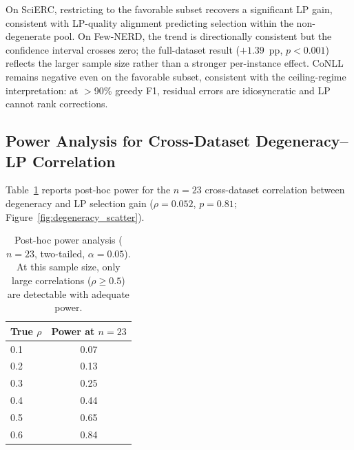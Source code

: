 \begin{table}[h]
\centering
\small
\caption{LP selection on the favorable subset (non-degenerate instances with LP range above the dataset-specific median) per dataset (Qwen3-8B, $N{=}8$, $T{=}1.0$). CI: bootstrap 95\% confidence interval.}
\label{tab:conditional_decomp}
\end{table}

On SciERC, restricting to the favorable subset recovers a significant LP gain, consistent with LP-quality alignment predicting selection within the non-degenerate pool.
On Few-NERD, the trend is directionally consistent but the confidence interval crosses zero; the full-dataset result ($+1.39$~pp, $p{<}0.001$) reflects the larger sample size rather than a stronger per-instance effect.
CoNLL remains negative even on the favorable subset, consistent with the ceiling-regime interpretation: at $>$90\% greedy F1, residual errors are idiosyncratic and LP cannot rank corrections.

\subsection{Power Analysis for Cross-Dataset Degeneracy--LP Correlation}\label{app:power_analysis}

Table~\ref{tab:power_analysis} reports post-hoc power for the $n{=}23$ cross-dataset correlation between degeneracy and LP selection gain ($\rho{=}0.052$, $p{=}0.81$; Figure~\ref{fig:degeneracy_scatter}).

\begin{table}[h]
\centering
\small
\caption{Post-hoc power analysis ($n{=}23$, two-tailed, $\alpha{=}0.05$). At this sample size, only large correlations ($\rho{\geq}0.5$) are detectable with adequate power.}
\label{tab:power_analysis}
\begin{tabular}{lc}
\toprule
True $\rho$ & Power at $n{=}23$ \\
\midrule
0.1 & 0.07 \\
0.2 & 0.13 \\
0.3 & 0.25 \\
0.4 & 0.44 \\
0.5 & 0.65 \\
0.6 & 0.84 \\
\bottomrule
\end{tabular}
\end{table}

